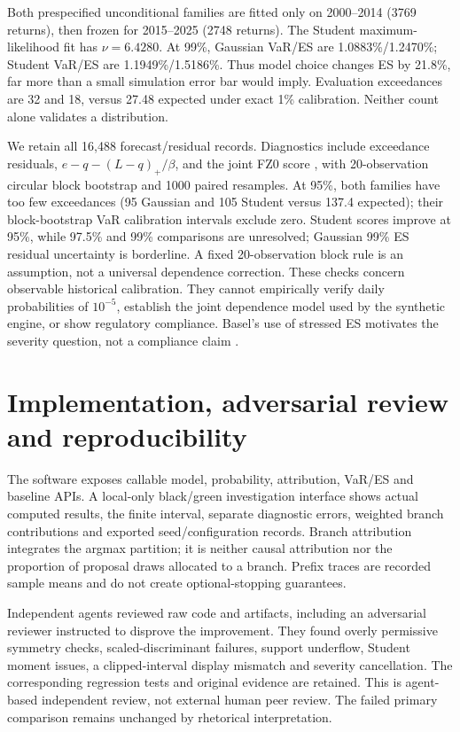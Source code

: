 \documentclass[11pt]{article}
\begin{document}
Both prespecified unconditional families are fitted only on 2000--2014 (3769 returns), then frozen for 2015--2025 (2748 returns). The Student maximum-likelihood fit has $\nu=6.4280 $. At 99\%, Gaussian VaR/ES are 1.0883\%/1.2470\%; Student VaR/ES are 1.1949\%/1.5186\%. Thus model choice changes ES by 21.8\%, far more than a small simulation error bar would imply. Evaluation exceedances are 32 and 18, versus 27.48 expected under exact 1\% calibration. Neither count alone validates a distribution.

We retain all 16,488 forecast/residual records. Diagnostics include exceedance residuals, $ e-q-(L-q)_+/\beta $, and the joint FZ0 score \citep{patton2019}, with 20-observation circular block bootstrap and 1000 paired resamples. At 95\%, both families have too few exceedances (95 Gaussian and 105 Student versus 137.4 expected); their block-bootstrap VaR calibration intervals exclude zero. Student scores improve at 95\%, while 97.5\% and 99\% comparisons are unresolved; Gaussian 99\% ES residual uncertainty is borderline. A fixed 20-observation block rule is an assumption, not a universal dependence correction. These checks concern observable historical calibration. They cannot empirically verify daily probabilities of $10^{-5}$, establish the joint dependence model used by the synthetic engine, or show regulatory compliance. Basel's use of stressed ES motivates the severity question, not a compliance claim \citep{basel}.

\section{Implementation, adversarial review and reproducibility}
The software exposes callable model, probability, attribution, VaR/ES and baseline APIs. A local-only black/green investigation interface shows actual computed results, the finite interval, separate diagnostic errors, weighted branch contributions and exported seed/configuration records. Branch attribution integrates the argmax partition; it is neither causal attribution nor the proportion of proposal draws allocated to a branch. Prefix traces are recorded sample means and do not create optional-stopping guarantees.

Independent agents reviewed raw code and artifacts, including an adversarial reviewer instructed to disprove the improvement. They found overly permissive symmetry checks, scaled-discriminant failures, support underflow, Student moment issues, a clipped-interval display mismatch and severity cancellation. The corresponding regression tests and original evidence are retained. This is agent-based independent review, not external human peer review. The failed primary comparison remains unchanged by rhetorical interpretation.
\end{document}
